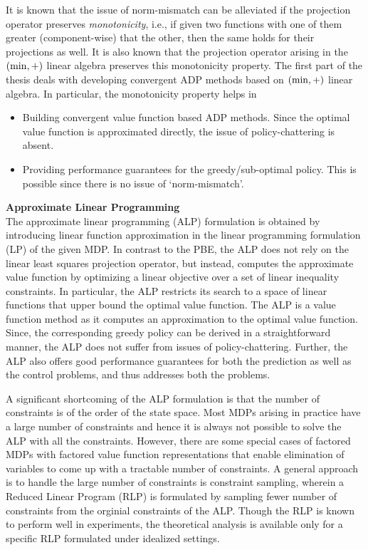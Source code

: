 It is known that \cite{BertB} the issue of norm-mismatch can be alleviated if the projection operator preserves \emph{monotonicity}, i.e., if given two functions with one of them greater (component-wise) that the other, then the same holds for their projections as well. It is also known that the projection operator arising in the $(\min,+)$ linear algebra preserves this monotonicity property. The first part of the thesis deals with developing convergent ADP methods based on $(\min,+)$ linear algebra. In particular, the monotonicity property helps in
\begin{itemize}
\item Building convergent value function based ADP methods. Since the optimal value function is approximated directly, the issue of policy-chattering is absent.
\item Providing performance guarantees for the greedy/sub-optimal policy. This is possible since there is no issue of `norm-mismatch'.
\end{itemize}
\textbf{Approximate Linear Programming}\\
The approximate linear programming (ALP) formulation is obtained by introducing linear function approximation in the linear programming formulation (LP) of the given MDP. In contrast to the PBE, the ALP does not rely on the linear least squares projection operator, but instead, computes the approximate value function by optimizing a linear objective over a set of linear inequality constraints. In particular, the ALP restricts its search to a space of linear functions that upper bound the optimal value function. The ALP is a value function method as it computes an approximation to the optimal value function. Since, the corresponding greedy policy can be derived in a straightforward manner, the ALP does not suffer from issues of policy-chattering. Further, the ALP also offers good performance guarantees for both the prediction as well as the control problems, and thus addresses both the problems.\par
A significant shortcoming of the ALP formulation is that the number of constraints is of the order of the state space. Most MDPs arising in practice have a large number of constraints and hence it is always not possible to solve the ALP with all the constraints. However, there are some special cases of factored MDPs with factored value function representations that enable elimination of variables to come up with a tractable number of constraints. A general approach is to handle the large number of constraints is constraint sampling, wherein a Reduced Linear Program (RLP) is formulated by sampling fewer number of constraints from the orginial constraints of the ALP. Though the RLP is known to perform well in experiments, the theoretical analysis is available only for a specific RLP formulated under idealized settings.\par
